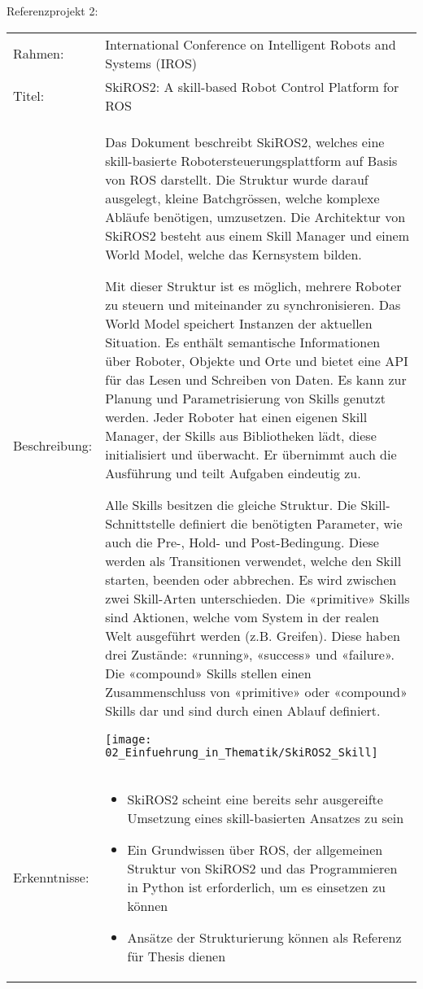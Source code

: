 	\newpage
	
	Referenzprojekt 2:
	\vspace{2mm}
	\\
	\begin{tabularx}{\textwidth}{@{}>{}p{8em} X@{}}
		Rahmen: & 
		International Conference on Intelligent Robots and Systems (IROS)
		\\
		
		Titel: & 
		SkiROS2: A skill-based Robot Control Platform for ROS 
		\\
		
		Beschreibung: & 
		Das Dokument beschreibt SkiROS2, welches eine skill-basierte Robotersteuerungsplattform auf Basis von ROS darstellt.  Die Struktur wurde darauf ausgelegt, kleine Batchgrössen, welche komplexe Abläufe benötigen, umzusetzen.  Die Architektur von SkiROS2 besteht aus einem Skill Manager und einem World Model, welche das Kernsystem bilden.
		
		Mit dieser Struktur ist es möglich, mehrere Roboter zu steuern und miteinander zu synchronisieren. Das World Model speichert Instanzen der aktuellen Situation. Es enthält semantische Informationen über Roboter, Objekte und Orte und bietet eine API für das Lesen und Schreiben von Daten. Es kann zur Planung und Parametrisierung von Skills genutzt werden. Jeder Roboter hat einen eigenen Skill Manager, der Skills aus Bibliotheken lädt, diese initialisiert und überwacht. Er übernimmt auch die Ausführung und teilt Aufgaben eindeutig zu.
		
		Alle Skills besitzen die gleiche Struktur. Die Skill-Schnittstelle definiert die benötigten Parameter, wie auch die Pre-, Hold- und Post-Bedingung. Diese werden als Transitionen verwendet, welche den Skill starten, beenden oder abbrechen. Es wird zwischen zwei Skill-Arten unterschieden. Die «primitive» Skills sind Aktionen, welche vom System in der realen Welt ausgeführt werden (z.B. Greifen). Diese haben drei Zustände: «running», «success» und «failure». Die «compound» Skills stellen einen Zusammenschluss von «primitive» oder «compound» Skills dar und sind durch einen Ablauf definiert. 
		
		\texttt{[image: 02\_Einfuehrung\_in\_Thematik/SkiROS2\_Skill]}
		\\
		
		Erkenntnisse: & 
		\begin{itemize}
			\item SkiROS2 scheint eine bereits sehr ausgereifte Umsetzung eines skill-basierten Ansatzes zu sein 
			\item Ein Grundwissen über ROS, der allgemeinen Struktur von SkiROS2 und das Programmieren in Python ist erforderlich, um es einsetzen zu können
			\item Ansätze der Strukturierung können als Referenz für Thesis dienen
		\end{itemize}
	\end{tabularx}
	
